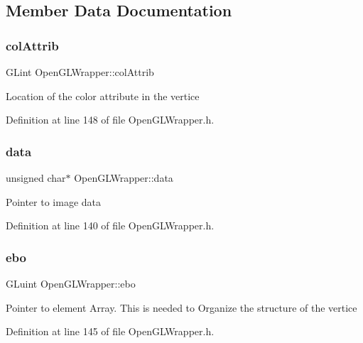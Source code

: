 \subsection{Member Data Documentation}
\mbox{\label{classOpenGLWrapper_ac280ce51d31dead83985ec09b1d40402}} 
\subsubsection{\texorpdfstring{colAttrib}{colAttrib}}
{\footnotesize\ttfamily G\+Lint Open\+G\+L\+Wrapper\+::col\+Attrib\hspace{0.3cm}{\ttfamily [private]}}

Location of the color attribute in the vertice 

Definition at line 148 of file Open\+G\+L\+Wrapper.\+h.

\mbox{\label{classOpenGLWrapper_a4d2dbdf66c23f052c301b216f675f96e}} 
\subsubsection{\texorpdfstring{data}{data}}
{\footnotesize\ttfamily unsigned char$\ast$ Open\+G\+L\+Wrapper\+::data\hspace{0.3cm}{\ttfamily [private]}}

Pointer to image data 

Definition at line 140 of file Open\+G\+L\+Wrapper.\+h.

\mbox{\label{classOpenGLWrapper_a3344488b7f5b35d603563de9579673f6}} 
\subsubsection{\texorpdfstring{ebo}{ebo}}
{\footnotesize\ttfamily G\+Luint Open\+G\+L\+Wrapper\+::ebo\hspace{0.3cm}{\ttfamily [private]}}

Pointer to element Array. This is needed to Organize the structure of the vertice 

Definition at line 145 of file Open\+G\+L\+Wrapper.\+h.


